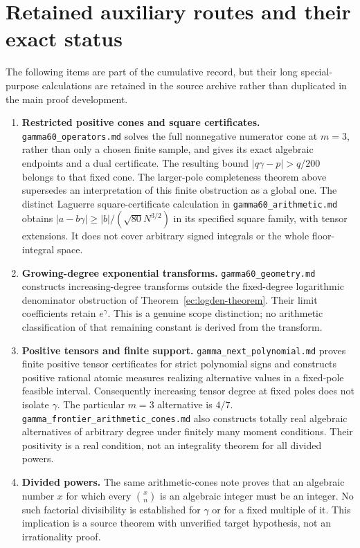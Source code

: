 \documentclass[11pt,a4paper]{article}
\theoremstyle{definition}
\theoremstyle{remark}
\numberwithin{equation}{section}
\begin{document}
\section{Retained auxiliary routes and their exact status}
\label{ec:retained-register}

The following items are part of the cumulative record, but their long
special-purpose calculations are retained in the source archive rather
than duplicated in the main proof development.

\begin{enumerate}
\item \textbf{Restricted positive cones and square certificates.}
\texttt{gamma60\_operators.md} solves the full nonnegative numerator
cone at $m=3$, rather than only a chosen finite sample, and gives its
exact algebraic endpoints and a dual certificate.  The resulting bound
$|q\gamma-p|>q/200$ belongs to that fixed cone.  The larger-pole
completeness theorem above supersedes an interpretation of this finite
obstruction as a global one.  The distinct Laguerre square-certificate
calculation in \texttt{gamma60\_arithmetic.md} obtains
$|a-b\gamma|\ge |b|/(\sqrt{80}N^{3/2})$ in its specified square
family, with tensor extensions.  It does not cover arbitrary signed
integrals or the whole floor-integral space.

\item \textbf{Growing-degree exponential transforms.}
\texttt{gamma60\_geometry.md} constructs increasing-degree transforms
outside the fixed-degree logarithmic denominator obstruction of
Theorem~\ref{ec:logden-theorem}.  Their limit coefficients retain
$e^\gamma$.  This is a genuine scope distinction; no arithmetic
classification of that remaining constant is derived from the transform.

\item \textbf{Positive tensors and finite support.}
\texttt{gamma\_next\_polynomial.md} proves finite positive tensor
certificates for strict polynomial signs and constructs positive rational
atomic measures realizing alternative values in a fixed-pole feasible
interval.  Consequently increasing tensor degree at fixed poles does
not isolate $\gamma$.  The particular $m=3$ alternative is $4/7$.
\texttt{gamma\_frontier\_arithmetic\_cones.md} also constructs
totally real algebraic alternatives of arbitrary degree under finitely
many moment conditions.  Their positivity is a real condition, not an
integrality theorem for all divided powers.

\item \textbf{Divided powers.}
The same arithmetic-cones note proves that an algebraic number $x$ for
which every $\binom xn$ is an algebraic integer must be an integer.
No such factorial divisibility is established for $\gamma$ or for a
fixed multiple of it.  This implication is a source theorem with
unverified target hypothesis, not an irrationality proof.


\end{enumerate}
\end{document}

